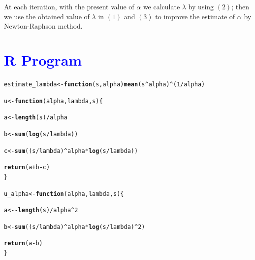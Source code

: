 \documentclass[11pt, a4paper]{article}\usepackage[]{graphicx}\usepackage[]{xcolor}
\makeatletter
\newcommand{\hlnum}[1]{\textcolor[rgb]{0.686,0.059,0.569}{#1}}%
\newcommand{\hlopt}[1]{\textcolor[rgb]{0,0,0}{#1}}%
\newcommand{\hldef}[1]{\textcolor[rgb]{0.345,0.345,0.345}{#1}}%
\newcommand{\hlkwa}[1]{\textcolor[rgb]{0.161,0.373,0.58}{\textbf{#1}}}%
\newcommand{\hlkwb}[1]{\textcolor[rgb]{0.69,0.353,0.396}{#1}}%
\newcommand{\hlkwc}[1]{\textcolor[rgb]{0.333,0.667,0.333}{#1}}%
\newcommand{\hlkwd}[1]{\textcolor[rgb]{0.737,0.353,0.396}{\textbf{#1}}}%
\newenvironment{kframe}{%
 \def\at@end@of@kframe{}%
 \ifinner\ifhmode%
  \def\at@end@of@kframe{\end{minipage}}%
  \begin{minipage}{\columnwidth}%
 \fi\fi%
 \def\FrameCommand##1{\hskip\@totalleftmargin \hskip-\fboxsep
 \colorbox{shadecolor}{##1}\hskip-\fboxsep
     \hskip-\linewidth \hskip-\@totalleftmargin \hskip\columnwidth}%
 \MakeFramed {\advance\hsize-\width
   \@totalleftmargin\z@ \linewidth\hsize
   \@setminipage}}%
 {\par\unskip\endMakeFramed%
 \at@end@of@kframe}
\newenvironment{knitrout}{}{} %
\makeatother
\begin{document}
At each iteration, with the present value of $\alpha$ we calculate $\lambda$ by using $(2)$; then we use the obtained value of $\lambda$ in $(1)$ and $(3)$ to improve the estimate of $\alpha$ by Newton-Raphson method.

\section*{\faArrowAltCircleRight[regular] \textcolor{blue}{R Program}}

\begin{knitrout}
\color{fgcolor}\begin{kframe}
\begin{alltt}
\hldef{estimate_lambda} \hlkwb{<-} \hlkwa{function}\hldef{(}\hlkwc{s}\hldef{,} \hlkwc{alpha}\hldef{)} \hlkwd{mean}\hldef{(s}\hlopt{^}\hldef{alpha)}\hlopt{^}\hldef{(}\hlnum{1}\hlopt{/}\hldef{alpha)}
\end{alltt}
\end{kframe}
\end{knitrout}

\begin{knitrout}
\color{fgcolor}\begin{kframe}
\begin{alltt}
\hldef{u} \hlkwb{<-} \hlkwa{function}\hldef{(}\hlkwc{alpha}\hldef{,} \hlkwc{lambda}\hldef{,} \hlkwc{s}\hldef{)\{}

  \hldef{a} \hlkwb{<-} \hlkwd{length}\hldef{(s)} \hlopt{/} \hldef{alpha}

  \hldef{b} \hlkwb{<-} \hlkwd{sum}\hldef{(}\hlkwd{log}\hldef{(s} \hlopt{/} \hldef{lambda))}

  \hldef{c} \hlkwb{<-} \hlkwd{sum}\hldef{((s} \hlopt{/} \hldef{lambda)}\hlopt{^}\hldef{alpha} \hlopt{*} \hlkwd{log}\hldef{(s} \hlopt{/} \hldef{lambda))}

  \hlkwd{return}\hldef{(a} \hlopt{+} \hldef{b} \hlopt{-} \hldef{c)}
\hldef{\}}
\end{alltt}
\end{kframe}
\end{knitrout}


\begin{knitrout}
\color{fgcolor}\begin{kframe}
\begin{alltt}
\hldef{u_alpha} \hlkwb{<-} \hlkwa{function}\hldef{(}\hlkwc{alpha}\hldef{,} \hlkwc{lambda}\hldef{,} \hlkwc{s}\hldef{)\{}

  \hldef{a} \hlkwb{<-} \hlopt{-} \hlkwd{length}\hldef{(s)} \hlopt{/} \hldef{alpha}\hlopt{^}\hlnum{2}

  \hldef{b} \hlkwb{<-} \hlkwd{sum}\hldef{((s} \hlopt{/} \hldef{lambda)}\hlopt{^}\hldef{alpha} \hlopt{*} \hlkwd{log}\hldef{(s} \hlopt{/} \hldef{lambda)}\hlopt{^}\hlnum{2}\hldef{)}

  \hlkwd{return}\hldef{(a} \hlopt{-} \hldef{b)}
\hldef{\}}
\end{alltt}
\end{kframe}
\end{knitrout}
\end{document}
